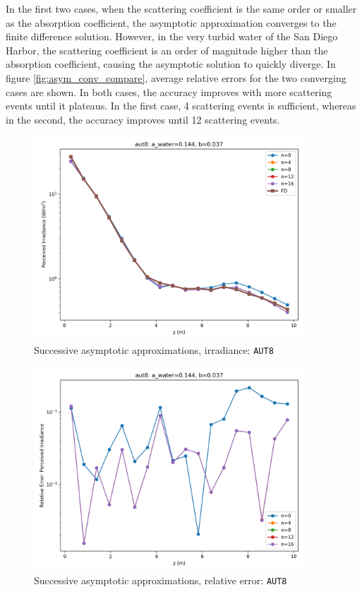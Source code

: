 \documentclass[ms,cpyr,lof,lot]{uathesis}
\begin{document}
In the first two cases, when the scattering coefficient is the same order or smaller as the absorption coefficient,
the asymptotic approximation converges to the finite difference solution.
However, in the very turbid water of the San Diego Harbor, the scattering coefficient is an order of magnitude higher
than the absorption coefficient, causing the asymptotic solution to quickly diverge.
In figure \ref{fig:asym_conv_compare}, average relative errors for the two converging cases are shown.
In both cases, the accuracy improves with more scattering events until it plateaus.
In the first case, 4 scattering events is sufficient, whereas in the second, the accuracy improves until 12 scattering events.

\begin{figure}[H]
  \centering
  \includegraphics[width=4in]{asym_conv_irrad_aut8}
  \caption{Successive asymptotic approximations, irradiance: \texttt{AUT8}}
\end{figure}

\begin{figure}[H]
  \centering
  \includegraphics[width=4in]{asym_conv_rel_err_aut8}
  \caption{Successive asymptotic approximations, relative error: \texttt{AUT8}}
\end{figure}
\end{document}
